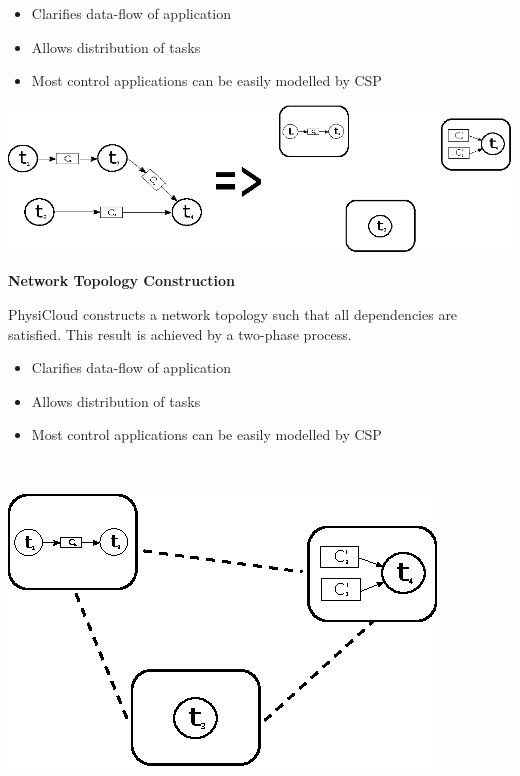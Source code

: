 \documentclass[landscape,paperwidth=40in,paperheight=32in]{baposter}
\newcommand{\BI}{\begin{itemize}[itemsep=.03in,parsep=0in,leftmargin=.2in]}
\newcommand{\EI}{\end{itemize}}
\begin{document}
\begin{poster}
{\begin{minipage}[t]{0.80\linewidth}
		\begin{minipage}{0.5\linewidth}
    			\BI
				\item Clarifies data-flow of application
				\item Allows distribution of tasks
				\item Most control applications can be easily modelled by CSP
			\EI	
		\end{minipage}		
		\begin{minipage}{0.7\linewidth}
			    	\includegraphics[width=\linewidth]{physicloud-tasks}
   	 	\end{minipage}	
    \end{minipage}
	
\vspace{1em}

{\bf\large Network Topology Construction}

	\smallskip

  	\begin{minipage}[t]{0.80\linewidth}
	
		PhysiCloud constructs a network topology such that all dependencies are satisfied.  This result is achieved by a two-phase process.
		
		\smallskip
		
		\begin{minipage}{0.5\linewidth}
    			\BI
				\item Clarifies data-flow of application
				\item Allows distribution of tasks
				\item Most control applications can be easily modelled by CSP
			\EI	
		\end{minipage}		
		~~~~~~
		\begin{minipage}{0.35\linewidth}
			    	\includegraphics[width=\linewidth]{physicloud-udp}
   	 	\end{minipage}	
    \end{minipage}

}
\end{poster}
\end{document}
